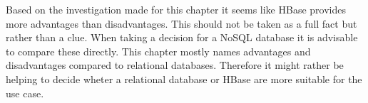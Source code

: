 Based on the investigation made for this chapter it seems like HBase provides more advantages than disadvantages. This should not be taken as a full fact but rather than a clue. When taking a decision for a NoSQL database it is advisable to compare these directly. This chapter mostly names advantages and disadvantages compared to relational databases. Therefore it might rather be helping to decide wheter a relational database or HBase are more suitable for the use case.


 
